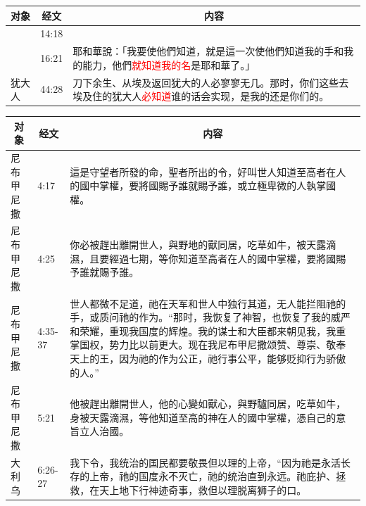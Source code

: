 \begin{table}[H]
\centering
\begin{tabular}{p{1.5cm}|p{}|p{13.0cm}}\hline\hline
\multicolumn{1}{c|}{对象}&\multicolumn{1}{c|}{经文}&\multicolumn{1}{c}{内容}\\\hline

&14:18&\\\hline
&16:21&耶和華說：「我要使他們知道，就是這一次使他們知道我的手和我的能力，他們\textcolor{red}{就知道我的名}是耶和華了。」\\\hline
犹大人&44:28&刀下余生、从埃及返回犹大的人必寥寥无几。那时，你们这些去埃及住的犹大人\textcolor{red}{必知道}谁的话会实现，是我的还是你们的。\\\hline 
\end{tabular}
\end{table}


\begin{table}[H]
\centering
\begin{tabular}{p{1.5cm}|p{}|p{13.0cm}}\hline\hline
\multicolumn{1}{c|}{对象}&\multicolumn{1}{c|}{经文}&\multicolumn{1}{c}{内容}\\\hline

尼布甲尼撒&4:17&這是守望者所發的命，聖者所出的令，好叫世人知道至高者在人的國中掌權，要將國賜予誰就賜予誰，或立極卑微的人執掌國權。\\\hline

尼布甲尼撒&4:25&你必被趕出離開世人，與野地的獸同居，吃草如牛，被天露滴濕，且要經過七期，等你知道至高者在人的國中掌權，要將國賜予誰就賜予誰。\\\hline

尼布甲尼撒&4:35-37&世人都微不足道，祂在天军和世人中独行其道，无人能拦阻祂的手，或质问祂的作为。“那时，我恢复了神智，也恢复了我的威严和荣耀，重现我国度的辉煌。我的谋士和大臣都来朝见我，我重掌国权，势力比以前更大。现在我尼布甲尼撒颂赞、尊崇、敬奉天上的王，因为祂的作为公正，祂行事公平，能够贬抑行为骄傲的人。”\\\hline

尼布甲尼撒&5:21&他被趕出離開世人，他的心變如獸心，與野驢同居，吃草如牛，身被天露滴濕，等他知道至高的神在人的國中掌權，憑自己的意旨立人治國。\\\hline
大利乌&6:26-27&我下令，我统治的国民都要敬畏但以理的上帝，“因为祂是永活长存的上帝，祂的国度永不灭亡，祂的统治直到永远。祂庇护、拯救，在天上地下行神迹奇事，救但以理脱离狮子的口。\\\hline 
\end{tabular}
\end{table}


